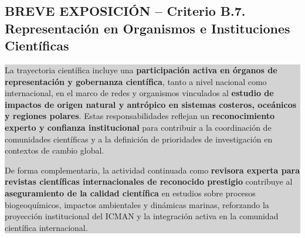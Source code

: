 \documentclass[11pt,a4paper]{article}
\newcommand{\breveexposicion}[2]{
    \subsection*{\color{darkgray}\textbf{BREVE EXPOSICIÓN -- #1}}
    \vspace{0.3em}
    \noindent\colorbox{lightgray}{%
        \begin{minipage}{0.97\textwidth}
        \vspace{0.5em}
        \color{darkgray}
        #2
        \vspace{0.5em}
        \end{minipage}
    }
    \vspace{1em}
}
\begin{document}
\breveexposicion{Criterio B.7. Representación en Organismos e Instituciones Científicas}{
La trayectoria científica incluye una \textbf{participación activa en órganos de representación y gobernanza científica}, tanto a nivel nacional como internacional, en el marco de redes y organismos vinculados al \textbf{estudio de impactos de origen natural y antrópico en sistemas costeros, oceánicos y regiones polares}. Estas responsabilidades reflejan un \textbf{reconocimiento experto y confianza institucional} para contribuir a la coordinación de comunidades científicas y a la definición de prioridades de investigación en contextos de cambio global.

De forma complementaria, la actividad continuada como \textbf{revisora experta para revistas científicas internacionales de reconocido prestigio} contribuye al \textbf{aseguramiento de la calidad científica} en estudios sobre procesos biogeoquímicos, impactos ambientales y dinámicas marinas, reforzando la proyección institucional del ICMAN y la integración activa en la comunidad científica internacional.
}
\end{document}

